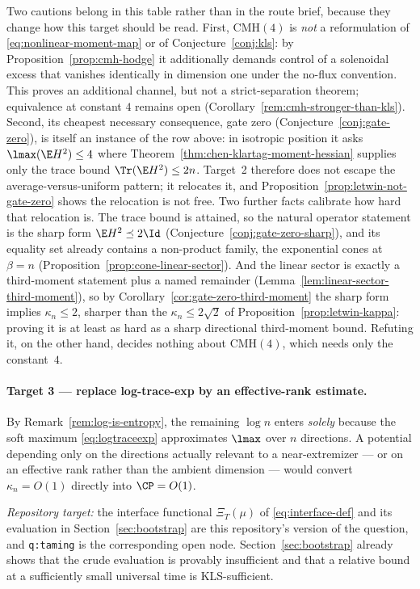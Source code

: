 \documentclass[../../main.tex]{subfiles}
\begin{document}
Two cautions belong in this table rather than in the route brief, because they change how this
target should be read. First, $\mathrm{CMH}(4)$ is \emph{not} a reformulation of
\eqref{eq:nonlinear-moment-map} or of Conjecture~\ref{conj:kls}: by
Proposition~\ref{prop:cmh-hodge} it additionally demands control of a solenoidal excess that
vanishes identically in dimension one under the no-flux convention. This proves an additional
channel, but not a strict-separation theorem; equivalence at constant $4$ remains open
(Corollary~\ref{rem:cmh-stronger-than-kls}). Second, its cheapest necessary consequence, gate zero
(Conjecture~\ref{conj:gate-zero}), is itself an instance of the row above: in isotropic position
it asks $\lmax(\E H^2)\le4$ where Theorem~\ref{thm:chen-klartag-moment-hessian} supplies only the
trace bound $\Tr(\E H^2)\le2n$. Target~2 therefore does not escape the average-versus-uniform
pattern; it relocates it, and Proposition~\ref{prop:letwin-not-gate-zero} shows the relocation is
not free. Two further facts calibrate how hard that relocation is. The trace bound is attained,
so the natural operator statement is the sharp form $\E H^2\preceq2\Id$
(Conjecture~\ref{conj:gate-zero-sharp}), and its equality set already contains a non-product
family, the exponential cones at $\beta=n$ (Proposition~\ref{prop:cone-linear-sector}). And the
linear sector is exactly a third-moment statement plus a named remainder
(Lemma~\ref{lem:linear-sector-third-moment}), so by
Corollary~\ref{cor:gate-zero-third-moment} the sharp form implies $\kappa_n\le2$, sharper than
the $\kappa_n\le2\sqrt2$ of Proposition~\ref{prop:letwin-kappa}: proving it is at least as hard
as a sharp directional third-moment bound. Refuting it, on the other hand, decides nothing about
$\mathrm{CMH}(4)$, which needs only the constant~$4$.

\paragraph{Target 3 --- replace log-trace-exp by an effective-rank estimate.}
By Remark~\ref{rem:log-is-entropy}, the remaining $\log n$ enters \emph{solely} because the soft
maximum \eqref{eq:logtraceexp} approximates $\lmax$ over $n$ directions. A potential depending
only on the directions actually relevant to a near-extremizer --- or on an effective rank rather
than the ambient dimension --- would convert $\kappa_n=O(1)$ directly into $\CP=O(1)$.

\emph{Repository target:} the interface functional $\Xi_T(\mu)$ of \eqref{eq:interface-def} and
its evaluation in Section~\ref{sec:bootstrap} are this repository's version of the question, and
\texttt{q:taming} is the corresponding open node. Section~\ref{sec:bootstrap} already shows that
the crude evaluation is provably insufficient and that a relative bound at a sufficiently small
universal time is KLS-sufficient.
\end{document}
